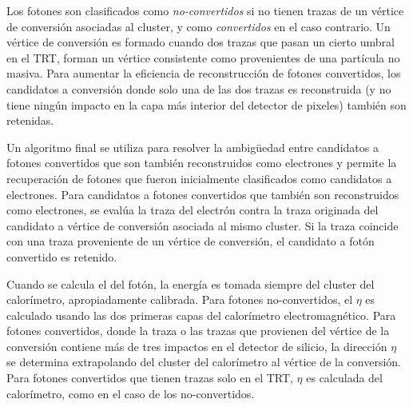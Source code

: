 Los fotones son clasificados como \emph{no-convertidos} si no tienen trazas de
un vértice de conversión asociadas al cluster, y como \emph{convertidos} en el
caso contrario. Un vértice de conversión es formado cuando dos trazas que pasan
un cierto umbral en el TRT, forman un vértice consistente como provenientes de
una partícula no masiva. Para aumentar la eficiencia de reconstrucción de
fotones convertidos, los candidatos a conversión donde solo una de las dos
trazas es reconstruida (y no tiene ningún impacto en la capa más interior del
detector de pixeles) también son retenidas.

Un algoritmo final \cite{Delmastro:1747242} se utiliza para resolver la
ambigüedad entre candidatos a fotones convertidos que son también reconstruidos
como electrones y permite la recuperación de fotones que fueron inicialmente
clasificados como candidatos a electrones.
Para candidatos a fotones convertidos que también son reconstruidos como
electrones, se evalúa la traza del electrón contra la traza originada del
candidato a vértice de conversión asociada al mismo cluster. Si la traza
coincide con una traza proveniente de un vértice de conversión, el candidato a
fotón convertido es retenido.


Cuando se calcula el {\pt} del fotón, la energía es tomada siempre del cluster
del calorímetro, apropiadamente calibrada\cite{Banfi:1259219}. Para fotones
no-convertidos, el $\eta$ es calculado usando las dos primeras capas del
calorímetro electromagnético. Para fotones convertidos, donde la traza o las
trazas que provienen del vértice de la conversión contiene más de tres impactos en
el detector de silicio, la dirección $\eta$ se determina extrapolando del
cluster del calorímetro al vértice de la conversión. Para fotones convertidos
que tienen trazas solo en el TRT, $\eta$ es calculada del calorímetro, %
como en el caso de los no-convertidos.

